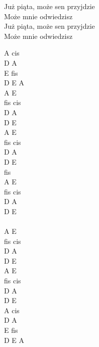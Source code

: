 \documentclass[a5paper, 10pt]{book}
\begin{document}
\begin{minipage}[t]{0.7\textwidth}
\hspace*{4mm} Już piąta, może sen przyjdzie\\
\hspace*{4mm} Może mnie odwiedzisz\\
\hspace*{4mm} Już piąta, może sen przyjdzie\\
\hspace*{4mm} Może mnie odwiedzisz\\

\end{minipage}
\begin{minipage}[t]{0.3\textwidth}
A cis\\ 
D A\\
E fis\\
D E A\\

A E\\
fis cis\\
D A\\
D E\\

A E\\
fis cis\\
D A\\
D E\\
fis\\

A E\\
fis cis\\
D A\\
D E\\

~\\

A E\\
fis cis\\
D A\\
D E\\

A E\\
fis cis\\
D A\\
D E\\

A cis \\
D A \\
E fis\\
D E A\\
\end{minipage}

\newpage
\end{document}
